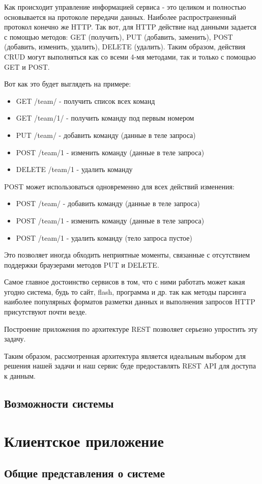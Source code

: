 Как происходит управление информацией сервиса - это целиком и полностью основывается на протоколе передачи данных. Наиболее распространенный протокол конечно же HTTP. Так вот, для HTTP действие над данными задается с помощью методов: GET (получить), PUT (добавить, заменить), POST (добавить, изменить, удалить), DELETE (удалить). Таким образом, действия CRUD могут выполняться как со всеми 4-мя методами, так и только с помощью GET и POST.

Вот как это будет выглядеть на примере:

\begin{itemize}
 \item GET /team/ - получить список всех команд
  \item GET /team/1/ - получить команду под первым номером
  \item PUT /team/ - добавить команду (данные в теле запроса)
  \item POST /team/1 - изменить команду (данные в теле запроса)
  \item DELETE /team/1 - удалить команду
\end{itemize}

POST может использоваться одновременно для всех действий изменения: 

\begin{itemize}
  \item POST /team/ - добавить команду (данные в теле запроса)
  \item POST /team/1 - изменить команду (данные в теле запроса)
  \item POST /team/1 - удалить команду (тело запроса пустое)
\end{itemize}


Это позволяет иногда обходить неприятные моменты, связанные с отсутствием поддержки браузерами методов PUT и DELETE.

Самое главное достоинство сервисов в том, что с ними работать может какая угодно система, будь то сайт, flash, программа и др. так как методы парсинга наиболее популярных форматов разметки данных и выполнения запросов HTTP присутствуют почти везде. 

Построение приложения по архитектуре REST позволяет серьезно упростить эту задачу. 

Таким образом, рассмотренная архитектура является идеальным выбором для решения нашей задачи и наш сервис буде предоставлять REST API для доступа к данным.

\subsection{Возможности системы}

\section{Клиентское приложение}
\subsection{Общие представления о системе}